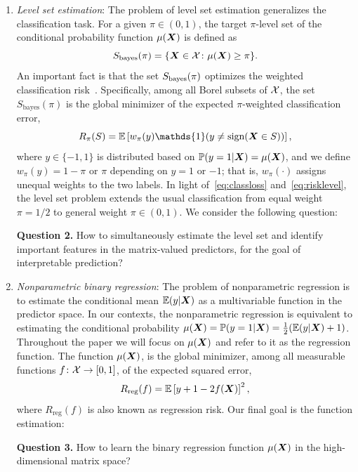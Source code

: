 \documentclass[11pt]{article}
\theoremstyle{plain}
\theoremstyle{definition}
\def\sign{\textup{sign}}
\def\bayesS{S_{\textup{bayes}}}
\begin{document}
\begin{enumerate}[label={2.\arabic*},wide, labelwidth=!, labelindent=0pt]
\item {\it Level set estimation}: The problem of level set estimation generalizes the classification task. For a given $\pi\in(0, 1)$, the target $\pi$-level set of the conditional probability function $\mu(\bm X)$ is defined as
\begin{equation}\label{eq:level}
\bayesS(\pi) = \{\mX\in\tX \colon \mu(\mX)\geq \pi\}.
\end{equation}
An important fact is that the set $\bayesS(\pi)$ optimizes the weighted classification risk~\citep{willett2007minimax,scott2007regression,wang2008probability}. Specifically, among all Borel subsets of $\mathcal{X}$, the set $S_{\text{bayes}}(\pi)$ is the global minimizer of the expected $\pi$-weighted classification error,
\begin{equation}\label{eq:risklevel}
R_\pi(S)=\mathbb{E}\left[ w_{\pi}(y)\mathds{1}(y\neq \sign(\mX\in S))\right],
\end{equation}
where $y\in\{-1,1\}$ is distributed based on $\mathbb{P}(y=1|\bm X)=\mu(\bm X)$, and we define $w_{\pi}(y)=1-\pi$ or $\pi$ depending on $y=1$ or $-1$; that is, $w_\pi(\cdot)$ assigns unequal weights to the two labels. In light of~\eqref{eq:classloss} and~\eqref{eq:risklevel}, the level set problem extends the usual classification from equal weight $\pi=1/2$ to general weight $\pi \in(0,1)$. %
We consider the following question:

{\bf Question 2.} How to simultaneously estimate the level set and identify important features in the matrix-valued predictors, for the goal of interpretable prediction?


\item {\it Nonparametric binary regression}: The problem of nonparametric regression is to estimate the conditional mean $\mathbb{E}(y|\bm X)$ as a multivariable function in the predictor space. In our contexts, the nonparametric regression is equivalent to estimating the conditional probability $\mu(\bm X)=\mathbb{P}(y=1|\bm X)=\frac{1}{2}(\mathbb{E}(y|\bm X)+1)$. Throughout the paper we will focus on $\mu(\bm X)$ and refer to it as the regression function. 
The function $\mu(\bm X)$, is the global minimizer, among all measurable functions $f\colon \mathcal{X}\to[0,1]$, of the expected squared error,
\begin{equation}\label{eq:regression}
R_{\text{reg}}(f)=\mathbb{E}\left[y+1-2f(\bm X)\right]^2,
\end{equation}
where $R_{\text{reg}}(f)$ is also known as regression risk. Our final goal is the function estimation:

{\bf Question 3.} How to learn the binary regression function $\mu(\bm X)$ in the high-dimensional matrix space?
\end{enumerate}
\end{document}
